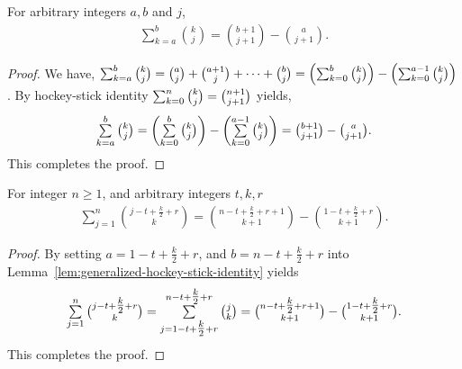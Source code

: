 \begin{lemma}
  \label{lem:generalized-hockey-stick-identity}
  For arbitrary integers $a,b$ and $j$,
  \begin{align*}
    \sum_{k=a}^{b} \binom{k}{j} = \binom{b+1}{j+1} - \binom{a}{j+1}.
  \end{align*}
  \begin{proof}
    We have,
    $\mathop{\textstyle\sum}_{k=a}^{b} \tbinom{k}{j}
    = \tbinom{a}{j} + \tbinom{a+1}{j} + \cdots + \tbinom{b}{j}
    = \left( \mathop{\textstyle\sum}_{k=0}^{b} \tbinom{k}{j} \right) - \left( \mathop{\textstyle\sum}_{k=0}^{a-1} \tbinom{k}{j} \right)$.
    By hockey-stick identity $\mathop{\textstyle\sum}_{k=0}^{n} \tbinom{k}{j} = \tbinom{n+1}{j+1}$ yields,
    \begin{align*}
      \mathop{\textstyle\sum}_{k=a}^{b} \tbinom{k}{j}
      = \left( \mathop{\textstyle\sum}_{k=0}^{b} \tbinom{k}{j} \right) - \left( \mathop{\textstyle\sum}_{k=0}^{a-1} \tbinom{k}{j} \right)
      = \tbinom{b+1}{j+1} - \tbinom{a}{j+1}.
    \end{align*}
    This completes the proof.
  \end{proof}
\end{lemma}

\begin{lemma}
  \label{lem:centered-hockey-stick-identity}
  For integer $n\geq1$, and arbitrary integers $t,k,r$
  \begin{align*}
    \sum_{j=1}^{n} \binom{j -t + \frac{k}{2} +r}{k}
    = \binom{n -t + \frac{k}{2} + r +1}{k+1} - \binom{1 -t + \tfrac{k}{2} +r}{k+1}.
  \end{align*}
  \begin{proof}
    By setting $a=1 -t + \tfrac{k}{2} +r$, and $b=n-t+ \tfrac{k}{2} +r$
    into Lemma~\eqref{lem:generalized-hockey-stick-identity} yields
    \begin{align*}
      \mathop{\textstyle\sum}_{j=1}^{n} \tbinom{j -t + \tfrac{k}{2} +r}{k} =
      \mathop{\textstyle\sum}_{j=1 -t + \tfrac{k}{2} +r}^{n -t + \tfrac{k}{2} +r} \tbinom{j}{k}
      = \tbinom{n -t + \tfrac{k}{2} + r +1}{k+1} - \tbinom{1 -t + \tfrac{k}{2} +r}{k+1}.
    \end{align*}
    This completes the proof.
  \end{proof}
\end{lemma}

